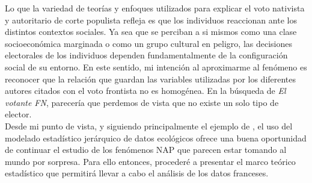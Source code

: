 Lo que la variedad de teorías y enfoques utilizados para explicar el voto nativista y autoritario de corte populista refleja es que los individuos reaccionan ante los distintos contextos sociales. Ya sea que se perciban a si mismos como una clase socioeconómica marginada o como un grupo cultural en peligro, las decisiones electorales de los individuos dependen fundamentalmente de la configuración social de su entorno. En este sentido, mi intención al aproximarme al fenómeno es reconocer que la relación que guardan las variables utilizadas por los diferentes autores citados con el voto frontista no es homogénea. En la búsqueda de \textit{El votante FN}, parecería que perdemos de vista que no existe un solo tipo de elector.\\

Desde mi punto de vista, y siguiendo principalmente el ejemplo de \textcites{Gombin09}{Gombin13}{Gombin13b}, el uso del modelado estadístico jerárquico de datos ecológicos ofrece una buena oportunidad de continuar el estudio de los fenómenos NAP que parecen estar tomando al mundo por sorpresa. Para ello entonces, procederé a presentar el marco teórico estadístico que permitirá llevar a cabo el análisis de los datos franceses. 